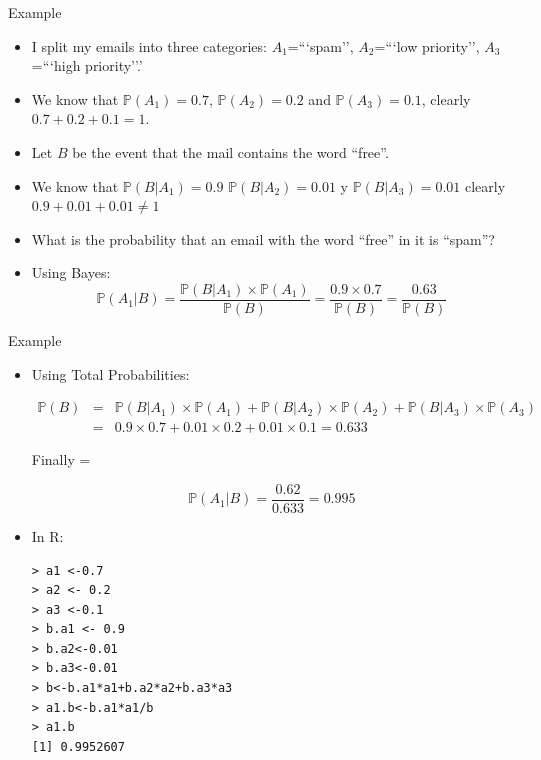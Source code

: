 \documentclass[handout]{beamer}
\begin{document}
\begin{frame}{Example}
\scriptsize{
\begin{itemize}
 \item I split my emails into three categories: $A_1$=```spam'', $A_2$=```low priority'', $A_3$=```high priority''.'
 \item We know that $\mathbb{P}(A_1)=0.7$, $\mathbb{P}(A_2)=0.2$ and $\mathbb{P}(A_3)=0.1$, clearly $0.7+0.2+0.1=1$.
 \item Let $B$ be the event that the mail contains the word ``free''.
 \item We know that $\mathbb{P}(B|A_1)=0.9$ $\mathbb{P}(B|A_2)=0.01$ y $\mathbb{P}(B|A_3)=0.01$ clearly $0.9+0.01+0.01 \neq 1$
 \item  What is the probability that an email with the word ``free'' in it is ``spam''?
 \item Using Bayes:
 \begin{displaymath}
   \mathbb{P}(A_1|B) = \frac{\mathbb{P}(B|A_1)\times \mathbb{P}(A_1)}{\mathbb{P}(B)} = \frac{0.9 \times 0.7}{\mathbb{P}(B)} = \frac{0.63}{\mathbb{P}(B)}
 \end{displaymath}

 
\end{itemize}


} 
\end{frame}

\begin{frame}[fragile]{Example}
\scriptsize{
\begin{itemize}
 \item Using Total Probabilities:
 
  \begin{eqnarray*}
  \mathbb{P}(B) & = & \mathbb{P}(B|A_1)\times\mathbb{P}(A_1)+\mathbb{P}(B|A_2)\times\mathbb{P}(A_2)+\mathbb{P}(B|A_3)\times\mathbb{P}(A_3) \\
  & = & 0.9 \times 0.7 + 0.01 \times 0.2 + 0.01 \times 0.1 = 0.633
 \end{eqnarray*}

Finally =  


 
 
 \begin{displaymath}
  \mathbb{P}(A_1|B) = \frac{0.62}{0.633} = 0.995
 \end{displaymath}

\item In R:
\begin{verbatim}
> a1 <-0.7
> a2 <- 0.2
> a3 <-0.1
> b.a1 <- 0.9 
> b.a2<-0.01
> b.a3<-0.01
> b<-b.a1*a1+b.a2*a2+b.a3*a3
> a1.b<-b.a1*a1/b
> a1.b
[1] 0.9952607 
\end{verbatim}


\end{itemize}




} 
\end{frame}
\end{document}
